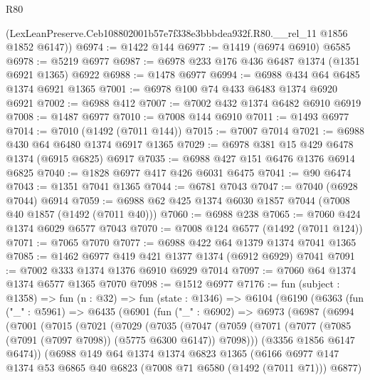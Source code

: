 \begin{lexlean}{R80}
\begin{coremodule}
      (LexLeanPreserve.Ceb108802001b57e7f338e3bbbdea932f.R80.__rel_11 @1856 @1852 @6147))
@6974 := @1422 @144
@6977 := @1419 (@6974 @6910) @6585
@6978 := @5219 @6977
@6987 := @6978 @233 @176 @436 @6487 @1374 (@1351 @6921 @1365) @6922
@6988 := @1478 @6977
@6994 := @6988 @434 @64 @6485 @1374 @6921 @1365
@7001 := @6978 @100 @74 @433 @6483 @1374 @6920 @6921
@7002 := @6988 @412
@7007 := @7002 @432 @1374 @6482 @6910 @6919
@7008 := @1487 @6977
@7010 := @7008 @144 @6910
@7011 := @1493 @6977
@7014 := @7010 (@1492 (@7011 @144))
@7015 := @7007 @7014
@7021 := @6988 @430 @64 @6480 @1374 @6917 @1365
@7029 := @6978 @381 @15 @429 @6478 @1374 (@6915 @6825) @6917
@7035 := @6988 @427 @151 @6476 @1376 @6914 @6825
@7040 := @1828 @6977 @417 @426 @6031 @6475
@7041 := @90 @6474
@7043 := @1351 @7041 @1365
@7044 := @6781 @7043
@7047 := @7040 (@6928 @7044) @6914
@7059 := @6988 @62 @425 @1374 @6030 @1857 @7044 (@7008 @40 @1857 (@1492 (@7011 @40)))
@7060 := @6988 @238
@7065 := @7060 @424 @1374 @6029 @6577 @7043
@7070 := @7008 @124 @6577 (@1492 (@7011 @124))
@7071 := @7065 @7070
@7077 := @6988 @422 @64 @1379 @1374 @7041 @1365
@7085 := @1462 @6977 @419 @421 @1377 @1374 (@6912 @6929) @7041
@7091 := @7002 @333 @1374 @1376 @6910 @6929 @7014
@7097 := @7060 @64 @1374 @1374 @6577 @1365 @7070
@7098 := @1512 @6977
@7176 := fun (subject : @1358) =>
  fun (n : @32) =>
  fun (state : @1346) =>
  @6104
    (@6190
      (@6363
        (fun ("_" : @5961) =>
        @6435
          (@6901
            (fun ("_" : @6902) =>
            @6973
              (@6987
                (@6994
                  (@7001
                    (@7015
                      (@7021
                        (@7029
                          (@7035
                            (@7047
                              (@7059
                                (@7071
                                  (@7077 (@7085 (@7091 (@7097 @7098)) (@5775 @6300 @6147)) @7098)))
                              (@3356 @1856 @6147 @6474))
                            (@6988
                              @149
                              @64
                              @1374
                              @1374
                              @6823
                              @1365
                              (@6166
                                @6977
                                @147
                                @1374
                                @53
                                @6865
                                @40
                                @6823
                                (@7008 @71 @6580 (@1492 (@7011 @71)))
                                @6877)

\end{coremodule}
\end{lexlean}

